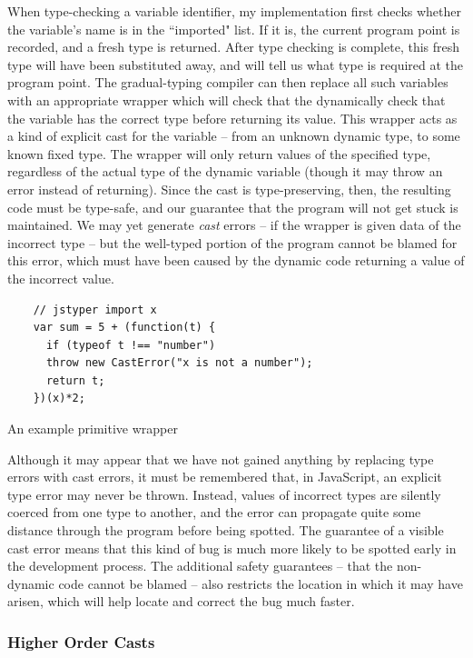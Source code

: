 \documentclass[12pt,a4paper,twoside,openright]{report}
\theoremstyle{definition}
\theoremstyle{dotless}
\begin{document}
When type-checking a variable identifier, my implementation first checks
whether the variable's name is in the ``imported" list. If it is, the current
program point is recorded, and a fresh type is returned. After type checking is
complete, this fresh type will have been substituted away, and will tell us
what type is required at the program point. The gradual-typing compiler can
then replace all such variables with an appropriate wrapper which will check
that the dynamically check that the variable has the correct type before
returning its value.  This wrapper acts as a kind of explicit cast for the
variable -- from an unknown dynamic type, to some known fixed type. The wrapper
will only return values of the specified type, regardless of the actual type of
the dynamic variable (though it may throw an error instead of returning).
Since the cast is type-preserving, then, the resulting code must be type-safe,
and our guarantee that the program will not get stuck is maintained. We may yet
generate \textit{cast} errors -- if the wrapper is given data of the incorrect type --
but the well-typed portion of the program cannot be blamed for this error,
which must have been caused by the dynamic code returning a value of the
incorrect value. 

\begin{program}
  \begin{verbatim}
	// jstyper import x
	var sum = 5 + (function(t) {
	  if (typeof t !== "number") 
	  throw new CastError("x is not a number");
	  return t;
	})(x)*2;
  \end{verbatim}
  \caption{An example primitive wrapper}\label{lst:importPrim}
\end{program}
Although it may appear that we have not gained anything by replacing type
errors with cast errors, it must be remembered that, in JavaScript, an explicit
type error may never be thrown. Instead, values of incorrect types are silently
coerced from one type to another, and the error can propagate quite some
distance through the program before being spotted. The guarantee of a visible
cast error means that this kind of bug is much more likely to be spotted early
in the development process. The additional safety guarantees -- that the
non-dynamic code cannot be blamed -- also restricts the location in which it
may have arisen, which will help locate and correct the bug much faster.

\subsubsection*{Higher Order Casts}
\end{document}
